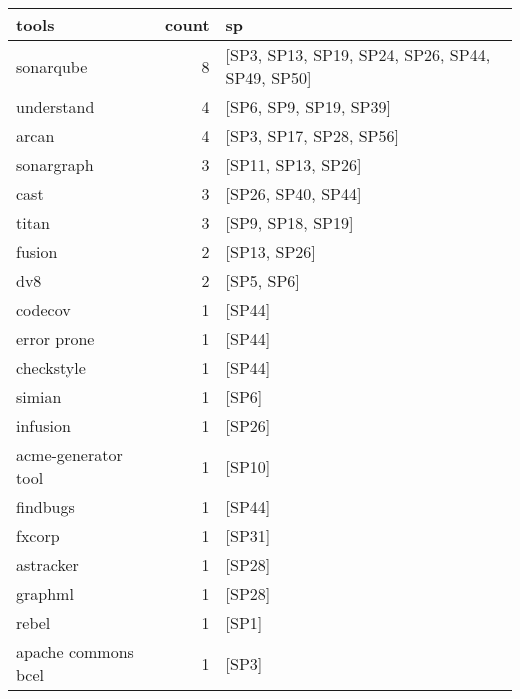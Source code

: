 \begin{tabular}{lrl}
\toprule
               tools &  count &                                               sp \\
\midrule
           sonarqube &      8 &  [SP3, SP13, SP19, SP24, SP26, SP44, SP49, SP50] \\
          understand &      4 &                           [SP6, SP9, SP19, SP39] \\
               arcan &      4 &                          [SP3, SP17, SP28, SP56] \\
          sonargraph &      3 &                               [SP11, SP13, SP26] \\
                cast &      3 &                               [SP26, SP40, SP44] \\
               titan &      3 &                                [SP9, SP18, SP19] \\
              fusion &      2 &                                     [SP13, SP26] \\
                 dv8 &      2 &                                       [SP5, SP6] \\
             codecov &      1 &                                           [SP44] \\
         error prone &      1 &                                           [SP44] \\
          checkstyle &      1 &                                           [SP44] \\
              simian &      1 &                                            [SP6] \\
            infusion &      1 &                                           [SP26] \\
 acme-generator tool &      1 &                                           [SP10] \\
            findbugs &      1 &                                           [SP44] \\
              fxcorp &      1 &                                           [SP31] \\
           astracker &      1 &                                           [SP28] \\
             graphml &      1 &                                           [SP28] \\
               rebel &      1 &                                            [SP1] \\
 apache commons bcel &      1 &                                            [SP3] \\

\end{tabular}
